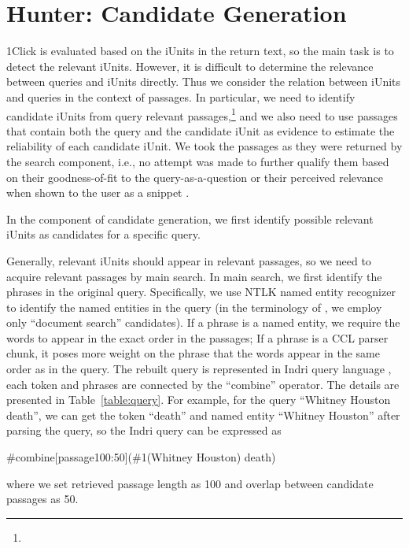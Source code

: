 \section{Hunter: Candidate Generation}
1Click is evaluated based on the iUnits in the return text, so the main task is to detect the relevant iUnits.
However, it is difficult to determine the relevance between queries and iUnits directly.
Thus we consider the relation between iUnits and queries in the context of passages.
In particular, we need to identify candidate iUnits from query relevant passages,\footnote{} and we also need to use passages that contain both the query and the candidate iUnit as evidence to estimate the reliability of each candidate iUnit.  We took the passages as they were returned by the search component, i.e., no attempt was made to further qualify them based on their goodness-of-fit to the query-as-a-question \cite{conf/cikm/KrikonCK12} or their perceived relevance when shown to the user as a snippet \cite{he-duboue-nie:2012:PAPERS}.

In the component of candidate generation, we first identify possible relevant iUnits as candidates for a specific query.

Generally, relevant iUnits should appear in relevant passages, so we need to acquire relevant passages by main search.
In main search, we first identify the phrases in the original query. 
Specifically, we use NTLK named entity recognizer to identify the named entities in the query (in the terminology of \cite{conf/aaai/Chu-CarrollF11}, we employ only ``document search'' candidates).
If a phrase is a named entity, we require the words to appear in the exact order in the passages;
If a phrase is a CCL parser chunk, it poses more weight on the phrase that the words appear in the same order as in the query. 
The rebuilt query is represented in Indri query language \cite{strohman_ICIA2005}, each token and phrases are connected by the ``combine'' operator.
The details are presented in Table~\ref{table:query}.
For example, for the query ``Whitney Houston death'', we can get the token ``death'' and named entity ``Whitney Houston'' after parsing the query, so the Indri query can be expressed as 

\begin{center}
\#combine[passage100:50](\#1(Whitney Houston) death)
\end{center}

\noindent where we set retrieved passage length as 100 and overlap between candidate passages as 50.

